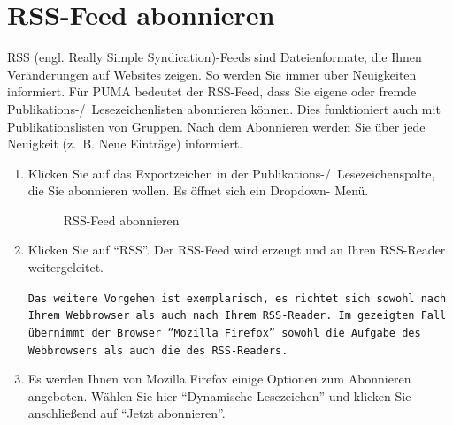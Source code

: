 \section{RSS-Feed abonnieren} 
RSS (engl. Really Simple Syndication)-Feeds sind Dateienformate, die Ihnen Veränderungen auf Websites zeigen. So werden Sie immer über Neuigkeiten informiert. Für PUMA bedeutet der RSS-Feed, dass Sie eigene oder fremde Publikations-/~Lesezeichenlisten abonnieren können. Dies funktioniert auch mit Publikationslisten von Gruppen. Nach dem Abonnieren werden Sie über jede Neuigkeit (z.~B. Neue Einträge) informiert. 
\begin{enumerate}
    \item Klicken Sie auf das Exportzeichen in der Publikations-/~Lesezeichenspalte, die Sie abonnieren wollen. Es öffnet sich ein Dropdown- Menü.
\begin{figure}[h!]
 \centering
 \caption{RSS-Feed abonnieren}
 \label{figure054}
\end{figure}
    \item  Klicken Sie auf \enquote{RSS}. Der RSS-Feed wird erzeugt und an Ihren RSS-Reader weitergeleitet. 
\begin{mdframed}[style=mdfexample1,frametitle={\texttt{ACHTUNG}},backgroundcolor=gray!40]\texttt{Das weitere Vorgehen ist exemplarisch, es richtet sich sowohl nach Ihrem Webbrowser als auch nach Ihrem RSS-Reader. Im gezeigten Fall übernimmt der Browser \enquote{Mozilla Firefox} sowohl die Aufgabe des Webbrowsers als auch die des RSS-Readers.}
\end{mdframed}
    \item Es werden Ihnen von Mozilla Firefox einige Optionen zum Abonnieren angeboten. Wählen Sie hier \enquote{Dynamische Lesezeichen} und klicken Sie anschließend auf \enquote{Jetzt abonnieren}.
\begin{figure}[h!]
 \centering

\end{figure}
\end{enumerate}
